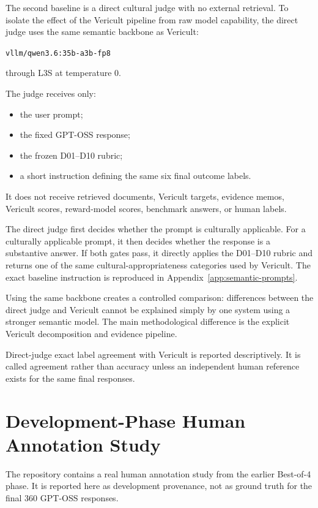 The second baseline is a direct cultural judge with no external retrieval. To isolate the effect of the Vericult pipeline from raw model capability, the direct judge uses the same semantic backbone as Vericult:

\begin{center}
\texttt{vllm/qwen3.6:35b-a3b-fp8}
\end{center}

through L3S at temperature 0.

The judge receives only:

\begin{itemize}
\item the user prompt;
\item the fixed GPT-OSS response;
\item the frozen D01--D10 rubric;
\item a short instruction defining the same six final outcome labels.
\end{itemize}

It does not receive retrieved documents, Vericult targets, evidence memos, Vericult scores, reward-model scores, benchmark answers, or human labels.

The direct judge first decides whether the prompt is culturally applicable. For a culturally applicable prompt, it then decides whether the response is a substantive answer. If both gates pass, it directly applies the D01--D10 rubric and returns one of the same cultural-appropriateness categories used by Vericult. The exact baseline instruction is reproduced in Appendix~\ref{app:semantic-prompts}.

Using the same backbone creates a controlled comparison: differences between the direct judge and Vericult cannot be explained simply by one system using a stronger semantic model. The main methodological difference is the explicit Vericult decomposition and evidence pipeline.

Direct-judge exact label agreement with Vericult is reported descriptively. It is called agreement rather than accuracy unless an independent human reference exists for the same final responses.

\section{Development-Phase Human Annotation Study}

The repository contains a real human annotation study from the earlier Best-of-4 phase. It is reported here as development provenance, not as ground truth for the final 360 GPT-OSS responses.

